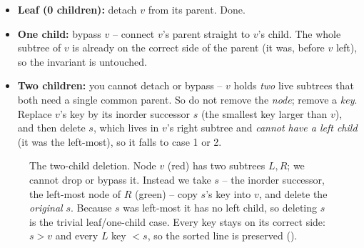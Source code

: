 \begin{itemize}[nosep]
  \item \textbf{Leaf (0 children):} detach $v$ from its parent. Done.
  \item \textbf{One child:} bypass $v$ -- connect $v$'s parent straight to $v$'s child. The whole
        subtree of $v$ is already on the correct side of the parent (it was, before $v$ left), so the
        invariant is untouched.
  \item \textbf{Two children:} you cannot detach or bypass -- $v$ holds \emph{two} live subtrees that
        both need a single common parent. So do not remove the \emph{node}; remove a \emph{key}.
        Replace $v$'s key by its inorder successor $s$ (the smallest key larger than $v$), and then
        delete $s$, which lives in $v$'s right subtree and \emph{cannot have a left child} (it was the
        left-most), so it falls to case 1 or 2.
\end{itemize}

\begin{figure}[H]
\centering
{}
\caption{The two-child deletion. Node $v$ (red) has two subtrees $L,R$; we cannot drop or bypass it.
Instead we take $s$ -- the inorder successor, the left-most node of $R$ (green) -- copy $s$'s key into
$v$, and delete the \emph{original} $s$. Because $s$ was left-most it has no left child, so deleting
$s$ is the trivial leaf/one-child case. Every key stays on its correct side: $s>v$ and every $L$ key
$<s$, so the sorted line is preserved ().}\label{fig:c05-del2}
\end{figure}

